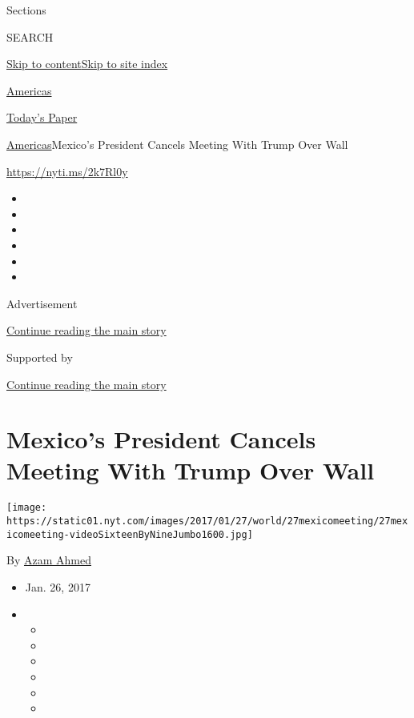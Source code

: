 Sections

SEARCH

\protect\hyperlink{site-content}{Skip to
content}\protect\hyperlink{site-index}{Skip to site index}

\href{https://www.nytimes.com/section/world/americas}{Americas}

\href{https://myaccount.nytimes.com/auth/login?response_type=cookie\&client_id=vi}{}

\href{https://www.nytimes.com/section/todayspaper}{Today's Paper}

\href{/section/world/americas}{Americas}\textbar{}Mexico's President
Cancels Meeting With Trump Over Wall

\url{https://nyti.ms/2k7Rl0y}

\begin{itemize}
\item
\item
\item
\item
\item
\item
\end{itemize}

Advertisement

\protect\hyperlink{after-top}{Continue reading the main story}

Supported by

\protect\hyperlink{after-sponsor}{Continue reading the main story}

\hypertarget{mexicos-president-cancels-meeting-with-trump-over-wall}{%
\section{Mexico's President Cancels Meeting With Trump Over
Wall}\label{mexicos-president-cancels-meeting-with-trump-over-wall}}

\texttt{[image: https://static01.nyt.com/images/2017/01/27/world/27mexicomeeting/27mexicomeeting-videoSixteenByNineJumbo1600.jpg]}

By \href{http://www.nytimes.com/by/azam-ahmed}{Azam Ahmed}

\begin{itemize}
\item
  Jan. 26, 2017
\item
  \begin{itemize}
  \item
  \item
  \item
  \item
  \item
  \item
  \end{itemize}
\end{itemize}


